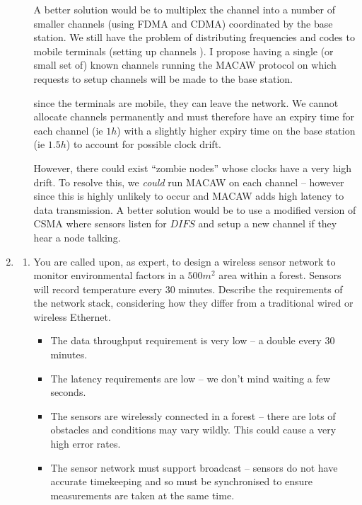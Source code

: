 \documentclass[10pt,\jkfside,a4paper]{article}
\begin{document}
\begin{enumerate}[label=(\alph*)]
\begin{enumerate}[label=(\roman*)]
A better solution would be to multiplex the channel into a number of smaller
channels (using FDMA and CDMA) coordinated by the base station. We still
have the problem of distributing frequencies and codes to mobile terminals
(setting up channels ). I propose having a single (or small set of) known
channels running the MACAW protocol on which requests to setup channels will
be made to the base station.

since the terminals are mobile, they can leave the network. We cannot
allocate channels permanently and must therefore have an expiry time for
each channel (ie $1h$) with a slightly higher expiry time on the base
station (ie $1.5h$) to account for possible clock drift.

However, there could exist ``zombie nodes'' whose clocks have a very high
drift. To resolve this, we \textit{could} run MACAW on each channel --
however since this is highly unlikely to occur and MACAW adds high latency
to data transmission. A better solution would be to use a modified version
of CSMA where sensors listen for $DIFS$ and setup a new channel if they
hear a node talking.

\end{enumerate}

\item

\begin{enumerate}[label=(\roman*)]

\item You are called upon, as expert, to design a wireless sensor network
to monitor environmental factors in a $500m^2$ area within a forest. Sensors
will record temperature every 30 minutes. Describe the requirements of the
network stack, considering how they differ from a traditional wired or
wireless Ethernet.

\begin{itemize}

\item The data throughput requirement is very low -- a double every 30 minutes.

\item The latency requirements are low -- we don't mind waiting a few seconds.

\item The sensors are wirelessly connected in a forest -- there are lots of
obstacles and conditions may vary wildly. This could cause a very high error
rates.

\item The sensor network must support broadcast -- sensors do not have
accurate timekeeping and so must be synchronised to ensure measurements are
taken at the same time.


\end{itemize}
\end{enumerate}
\end{enumerate}
\end{document}
